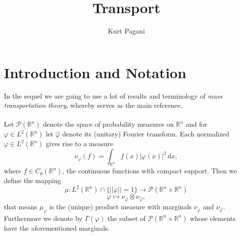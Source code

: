 \documentclass[12pt,a4paper,draft]{article}
\author{Kurt Pagani}
\title{Transport}
\newcommand{\RR}[1]{\mathbb{R}^#1}
\newcommand{\LL}[1]{L^2(\RR{#1})}
\newcommand{\Prob}[1]{\mathcal{P}({\RR #1})}
\newcommand{\Probc}[1]{\mathcal{P}({\RR #1 \times \RR #1})}
\begin{document}
\maketitle
\section{Introduction and Notation}
In the sequel we are going to use a lot of results and terminology of
{\sl mass transportation theory}, whereby \cite{villani_topics_2003} serves
as the main reference.
\\ \\
\noindent
Let $\Prob{n}$ denote the space of probability measures on $\RR n$ and for
$\varphi\in\LL{n}$ let $\hat\varphi$ denote its (unitary) Fourier transform.
Each normalized $\varphi\in\LL{n}$ gives rise to a measure
\begin{displaymath}
   \nu_{\varphi}(f)=\int_{\RR n} f(x) |\varphi(x)|^2 \,dx,
\end{displaymath}
where $f\in C_{0}(\RR n)$, the continuous functions with compact support. Then
we define the mapping
\begin{equation}
   \mu : \LL{n}\cap\{||\varphi||=1\} \longrightarrow \Probc{n} 
\end{equation}
\begin{displaymath}
   \varphi \longmapsto \nu_{\varphi}\otimes\nu_{\hat\varphi},
\end{displaymath}
that means $\mu_{\varphi}$ is the (unique) product measure with marginals 
$\nu_{\varphi}$ and $\nu_{\hat\varphi}$. Furthermore we denote by $\Gamma(\varphi)$
the subset of $\Probc{n}$ whose elements have the aforementioned marginals.
\end{document}
